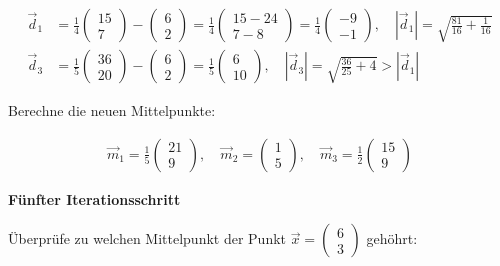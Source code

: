 \documentclass[11pt]{article}
\begin{document}
\[\begin{aligned}
\vec{d}_1 &= \frac{1}{4}\begin{pmatrix} 15 \\ 7 \end{pmatrix} -  \begin{pmatrix} 6 \\ 2 \end{pmatrix} =  \frac{1}{4} \begin{pmatrix} 15 - 24 \\ 7 -8  \end{pmatrix} = \frac{1}{4}\begin{pmatrix} -9 \\ -1 \end{pmatrix}, \quad \left| \vec{d}_1 \right| = \sqrt{\frac{81}{16} + \frac{1}{16}}  \\
\vec{d}_3 &= \frac{1}{5}\begin{pmatrix} 36 \\ 20 \end{pmatrix} -  \begin{pmatrix} 6 \\ 2 \end{pmatrix} =  \frac{1}{5}\begin{pmatrix} 6 \\ 10 \end{pmatrix}, \quad \left| \vec{d}_3 \right| = \sqrt{\frac{36}{25} + 4} > \left| \vec{d}_1 \right|
\end{aligned}\]

Berechne die neuen Mittelpunkte:

\[ \begin{aligned}
\vec{m}_1 = \frac{1}{5} \begin{pmatrix} 21 \\ 9 \end{pmatrix}, \quad 
\vec{m}_2 =  \begin{pmatrix} 1 \\ 5 \end{pmatrix}, \quad 
\vec{m}_3 = \frac{1}{2} \begin{pmatrix} 15 \\ 9 \end{pmatrix} 
\end{aligned} \]

\textbf{Fünfter Iterationsschritt}

Überprüfe zu welchen Mittelpunkt der Punkt
\(\vec{x} = \begin{pmatrix} 6 \\ 3 \end{pmatrix}\) gehöhrt:
\end{document}
